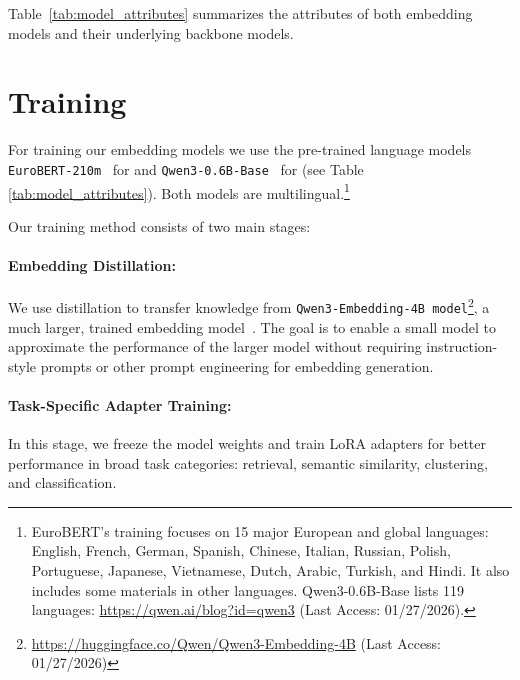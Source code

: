 \documentclass[11pt]{article}
\begin{document}
Table~\ref{tab:model_attributes} summarizes the attributes of both embedding models and their underlying backbone models.

\section{Training}
\label{sec:training}
For training our embedding models we use the pre-trained language models \texttt{EuroBERT-210m}~\cite{boizard2025eurobert} for \JEmbeddingVFiveTextNano{} and \texttt{Qwen3-0.6B-Base}~\cite{yang2025qwen3} for \JEmbeddingVFiveTextSmall{} (see Table \ref{tab:model_attributes}).
Both models are multilingual.\footnote{EuroBERT’s training focuses on 15 major European and global languages:  English, French, German, Spanish, Chinese, Italian, Russian, Polish, Portuguese, Japanese, Vietnamese, Dutch, Arabic, Turkish, and Hindi. It also includes some materials in other languages. Qwen3-0.6B-Base lists 119 languages:  \url{https://qwen.ai/blog?id=qwen3} \tiny{(Last Access: 01/27/2026)}.}

Our training method consists of two main stages:

\paragraph{Embedding Distillation:} We use distillation to transfer  knowledge from \texttt{Qwen3-Embedding-4B model}\footnote{\url{https://huggingface.co/Qwen/Qwen3-Embedding-4B} \tiny{(Last Access: 01/27/2026)}}, a much larger, trained embedding model~\cite{zhang2025qwen3}. The goal is to enable a small model to approximate the performance of the larger model without requiring instruction-style prompts or other prompt engineering for embedding generation.
%
\paragraph{Task-Specific Adapter Training:} 
In this stage, we freeze the model weights and train LoRA adapters for better performance in broad task categories: retrieval, semantic similarity, clustering, and classification.


\end{document}
